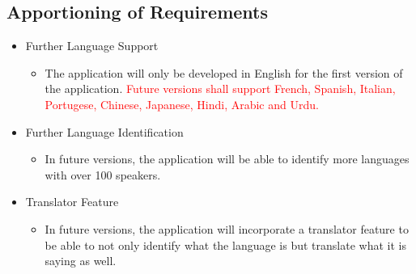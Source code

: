 \subsection{Apportioning of Requirements}
\label{sub:apportioning_of_requirements}
\begin{itemize}
	\item Further Language Support
	\begin{itemize}
		\item The application will only be developed in English for the first version of the application. \textcolor{red}{Future versions shall support French, Spanish, Italian, Portugese, Chinese, Japanese, Hindi, Arabic and Urdu.}
	\end{itemize}
	\item Further Language Identification
	\begin{itemize}
		\item In future versions, the application will be able to identify more languages with over 100 speakers.
	\end{itemize}
	\item Translator Feature
	\begin{itemize}
		\item In future versions, the application will incorporate a translator feature to be able to not only identify what the language is but translate what it is saying as well.
	\end{itemize}
\end{itemize}

